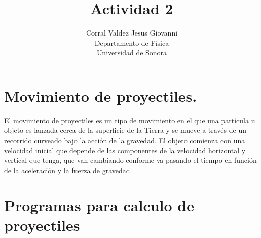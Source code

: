 \documentclass{article}
\title{Actividad 2}
\author{Corral Valdez Jesus Giovanni\\
Departamento de Física\\
Universidad de Sonora}
\begin{document}
\maketitle
\clearpage
\section{Movimiento de proyectiles.}
El movimiento de proyectiles es un tipo de movimiento en el que una partícula u objeto es lanzada cerca de la superficie de la Tierra y se mueve a través de un recorrido curveado bajo la acción de la gravedad. El objeto comienza con una velocidad inicial que depende de las componentes de la velocidad horizontal y vertical que tenga, que van cambiando conforme va pasando el tiempo en función de la aceleración y la fuerza de gravedad.

\clearpage
\section{Programas para calculo de proyectiles}
\end{document}
